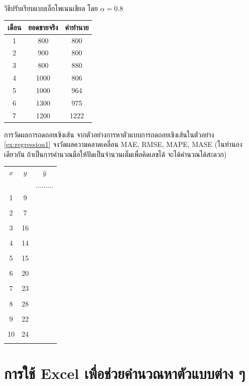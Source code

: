 \vspace{5cm}\\
วิธีปรับเรียบแบบเอ็กโพเนนเชียล โดย $\alpha=0.8$\\
\begin{tabular}{|c|c|c|}
	\hline
	เดือน & ยอดขายจริง & ค่าทำนาย \\ \hline
	1     & 800        & 800              \\ \hline
	2     & 900        & 800           \\ \hline
	3     & 800        & 880           \\ \hline
	4     & 1000       & 806           \\ \hline
	5     & 1000       & 964           \\ \hline
	6     & 1300       & 975           \\ \hline
	7     & 1200       & 1222           \\ \hline
\end{tabular}
\newpage
\begin{example}
	{การวัดผลการถดถอยเชิงเส้น}{}
	จากตัวอย่างการหาตัวแบบการถดถอยเชิงเส้นในตัวอย่าง \ref{ex:regression1} จงวัดผลความคลาดเคลื่อน MAE, RMSE, MAPE, MASE (ในทำนองเดียวกัน ถ้าเป็นการคำนวณมือให้ปัดเป็นจำนวนเต็มเพื่อคิดเลขได้ จะได้คำนวณได้สะดวก)
\end{example}
\begin{tabular}{|c|c|c|}
	\hline
	$x$ & $y$ & $\hat{y}$\\[0.05em] & &.........\\ \hline
	1     & 9   & \\[0.05em] & &\\ \hline
	2     & 7    & \\[0.05em] & &\\ \hline
	3     & 16    & \\[0.05em] & &\\ \hline
	4     & 14   & \\[0.05em] & &\\ \hline
	5     & 15   & \\[0.05em] & &\\ \hline
	6     & 20   & \\[0.05em] & &\\ \hline
	7     & 23  & \\[0.05em] &  &\\ \hline
	8     & 28  & \\[0.05em] &  &\\ \hline
	9     & 22   & \\[0.05em] & &\\ \hline
	10    & 24  &  \\[0.05em] & &\\ \hline
\end{tabular}

\newpage
\section{การใช้ Excel เพื่อช่วยคำนวณหาตัวแบบต่าง ๆ}
\newpage